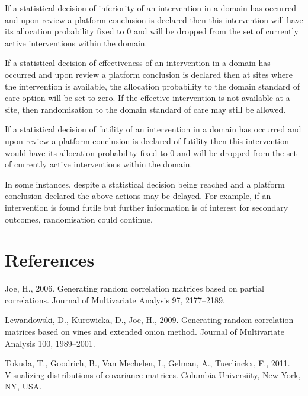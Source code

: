 \documentclass[
  11pt,
]{article}
\begin{document}
If a statistical decision of inferiority of an intervention in a domain has occurred and upon review a platform conclusion is declared then this intervention will have its allocation probability fixed to 0 and will be dropped from the set of currently active interventions within the domain.

If a statistical decision of effectiveness of an intervention in a domain has occurred and upon review a platform conclusion is declared then at sites where the intervention is available, the allocation probability to the domain standard of care option will be set to zero. If the effective intervention is not available at a site, then randomisation to the domain standard of care may still be allowed.

If a statistical decision of futility of an intervention in a domain has occurred and upon review a platform conclusion is declared of futility then this intervention would have its allocation probability fixed to 0 and will be dropped from the set of currently active interventions within the domain.

In some instances, despite a statistical decision being reached and a platform conclusion declared the above actions may be delayed.
For example, if an intervention is found futile but further information is of interest for secondary outcomes, randomisation could continue.

\clearpage

\hypertarget{references}{%
\section*{References}\label{references}}

\hypertarget{refs}{}
\leavevmode\hypertarget{ref-joe2006generating}{}%
Joe, H., 2006. Generating random correlation matrices based on partial correlations. Journal of Multivariate Analysis 97, 2177--2189.

\leavevmode\hypertarget{ref-lewandowski2009generating}{}%
Lewandowski, D., Kurowicka, D., Joe, H., 2009. Generating random correlation matrices based on vines and extended onion method. Journal of Multivariate Analysis 100, 1989--2001.

\leavevmode\hypertarget{ref-tokuda2011visualizing}{}%
Tokuda, T., Goodrich, B., Van Mechelen, I., Gelman, A., Tuerlinckx, F., 2011. Visualizing distributions of covariance matrices. Columbia Universiity, New York, NY, USA.
\end{document}
